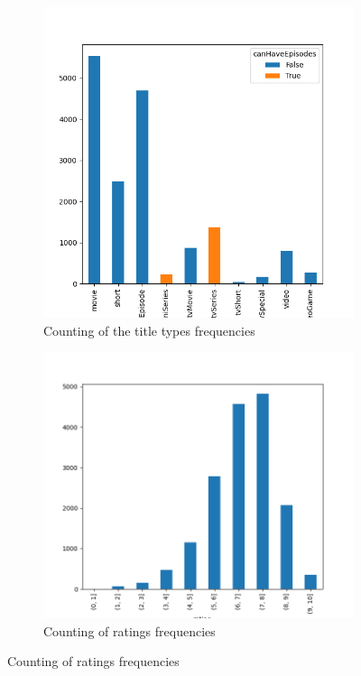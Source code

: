 \begin{figure}[H]
    \centering
    \begin{subfigure}{0.48\textwidth}
        \includegraphics[width=\textwidth]{plots/fig1_a.png}
        \caption{Counting of the title types frequencies} %
        \label{fig:sub1}
    \end{subfigure}
    \hfill
    \begin{subfigure}{0.48\textwidth}
        \includegraphics[width=\textwidth]{plots/fig1_b.png}
        \caption{Counting of ratings frequencies}
        \label{fig:sub2}
    \end{subfigure}
    

\end{figure}
